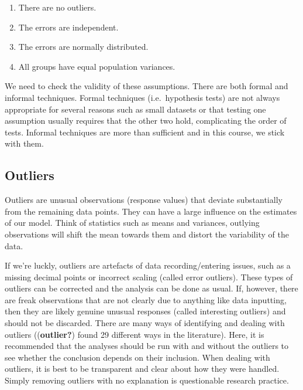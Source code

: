 \documentclass[
  letterpaper,
  DIV=11,
  numbers=noendperiod,
  oneside]{scrreprt}
\providecommand{\tightlist}{%
  \setlength{\itemsep}{0pt}\setlength{\parskip}{0pt}}\usepackage{longtable,booktabs,array}
\begin{document}
\begin{enumerate}
\def\labelenumi{\arabic{enumi}.}
\tightlist
\item
  There are no outliers.
\item
  The errors are independent.
\item
  The errors are normally distributed.
\item
  All groups have equal population variances.
\end{enumerate}

We need to check the validity of these assumptions. There are both
formal and informal techniques. Formal techniques (i.e.~hypothesis
tests) are not always appropriate for several reasons such as small
datasets or that testing one assumption usually requires that the other
two hold, complicating the order of tests. Informal techniques are more
than sufficient and in this course, we stick with them.

\subsection*{Outliers}\label{outliers}

Outliers are unusual observations (response values) that deviate
substantially from the remaining data points. They can have a large
influence on the estimates of our model. Think of statistics such as
means and variances, outlying observations will shift the mean towards
them and distort the variability of the data.

If we're luckly, outliers are artefacts of data recording/entering
issues, such as a missing decimal points or incorrect scaling (called
error outliers). These types of outliers can be corrected and the
analysis can be done as usual. If, however, there are freak observations
that are not clearly due to anything like data inputting, then they are
likely genuine unusual responses (called interesting outliers) and
should not be discarded. There are many ways of identifying and dealing
with outliers
((\textbf{outlier?})
found 29 different ways in the literature). Here, it is recommended that
the analyses should be run with and without the outliers to see whether
the conclusion depends on their inclusion. When dealing with outliers,
it is best to be transparent and clear about how they were handled.
Simply removing outliers with no explanation is questionable research
practice.
\end{document}
